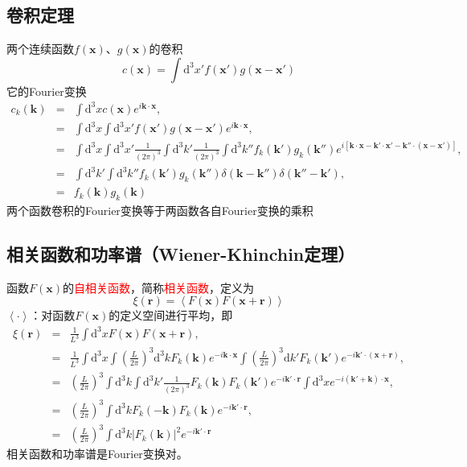 \documentclass[12pt,a4paper]{article}
\renewcommand{\vec}[1]{\boldsymbol{#1}}
\newcommand{\dif}{\mathrm{d}}
\begin{document}
\subsection{卷积定理}
两个连续函数$f(\vec{x})$、$g(\vec{x})$的卷积
\begin{equation}
c(\vec{x}) = \int \dif^3 x' f(\vec{x}') g(\vec{x} -\vec{x}')
\end{equation}
它的Fourier变换
\begin{eqnarray}
\nonumber c_k(\vec{k}) &=& \int \dif^3 x c(\vec{x}) e^{i\vec{k} \cdot \vec{x}}, \\
\nonumber &=& \int \dif^3 x \int \dif^3 x' f(\vec{x}') g(\vec{x}-\vec{x}') e^{i\vec{k} \cdot \vec{x}}, \\
\nonumber &=& \int \dif^3 x \int \dif^3 x' \frac{1}{(2\pi)^3} \int \dif^3 k' \frac{1}{(2\pi)^3} \int \dif^3 k'' f_k(\vec{k}') g_k(\vec{k}'') e^{i[\vec{k}\cdot \vec{x} -\vec{k}'\cdot \vec{x}' -\vec{k}''\cdot (\vec{x}-\vec{x}') ]}, \\
\nonumber &=& \int \dif^3 k' \int \dif^3 k'' f_k(\vec{k}') g_k(\vec{k}'') \delta(\vec{k}-\vec{k}'') \delta(\vec{k}''-\vec{k}'), \\
&=& f_k(\vec{k}) g_k(\vec{k})
\end{eqnarray}
两个函数卷积的Fourier变换等于两函数各自Fourier变换的乘积


\subsection{相关函数和功率谱（Wiener-Khinchin定理）}

函数$F(\vec{x})$的\textcolor{red}{自相关函数}，简称\textcolor{red}{相关函数}，定义为
\begin{equation}
\xi(\vec{r}) =  \left\langle F(\vec{x}) F(\vec{x}+\vec{r}) \right\rangle 
\end{equation}
$\left\langle \cdot \right\rangle$：对函数$F(\vec{x})$的定义空间进行平均，即
\begin{eqnarray}
\nonumber \xi(\vec{r}) &=& \frac{1}{L^3} \int \dif^3 x F(\vec{x}) F(\vec{x}+\vec{r}), \\
\nonumber &=& \frac{1}{L^3} \int \dif^3 x \int \left(\frac{L}{2\pi} \right)^3 \dif^3 k F_k(\vec{k}) e^{-i\vec{k}\cdot \vec{x}} \int \left(\frac{L}{2\pi} \right)^3 \dif k' F_k(\vec{k}') e^{-i\vec{k}'\cdot (\vec{x}+\vec{r})}, \\
\nonumber &=& \left(\frac{L}{2\pi} \right)^3 \int \dif^3 k \int \dif^3 k' \frac{1}{(2\pi)^3} F_k(\vec{k}) F_k(\vec{k}') e^{-i\vec{k}'\cdot \vec{r}} \int \dif^3 x e^{-i(\vec{k}' + \vec{k})\cdot \vec{x}}, \\
\nonumber &=& \left(\frac{L}{2\pi} \right)^3 \int \dif^3 k F_k(-\vec{k}) F_k(\vec{k}) e^{-i\vec{k}'\cdot \vec{r}}, \\
&=& \left(\frac{L}{2\pi} \right)^3 \int \dif^3 k |F_k(\vec{k})|^2 e^{-i\vec{k}'\cdot \vec{r}}
\end{eqnarray}
相关函数和功率谱是Fourier变换对。
\end{document}
